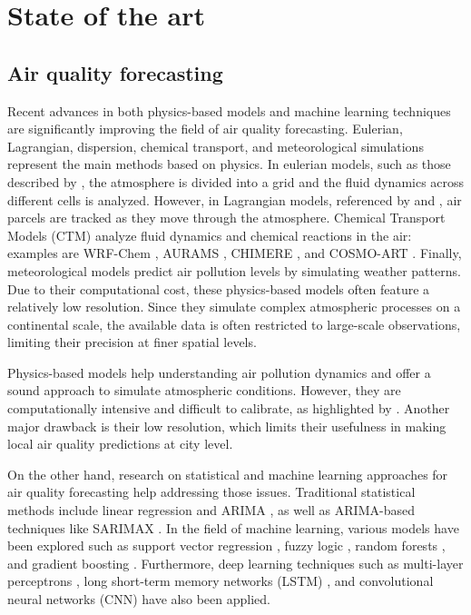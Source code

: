 \documentclass[12pt,a4paper]{book}
\begin{document}
\chapter{State of the art}
\section{Air quality forecasting}
Recent advances in both physics-based models and machine learning techniques are significantly improving the field of air quality forecasting. Eulerian, Lagrangian, dispersion, chemical transport, and meteorological simulations represent the main methods based on physics. In eulerian models, such as those described by \citet{wong_wrf-cmaq_2012}, the atmosphere is divided into a grid and the fluid dynamics across different cells is analyzed. However, in Lagrangian models, referenced by \citet{eliassen_aspects_1984} and \citet{romanov_graz_2020}, air parcels are tracked as they move through the atmosphere. Chemical Transport Models (CTM) analyze fluid dynamics and chemical reactions in the air: examples are WRF-Chem \citep{georgiou_evaluation_2022}, AURAMS \citep{smyth_comparative_2009}, CHIMERE \citep{menut_chimere_2021}, and COSMO-ART \citep{ponomarev_application_2020}. Finally, meteorological models \citep{liu_air_2022} predict air pollution levels by simulating weather patterns. Due to their computational cost, these physics-based models often feature a relatively low resolution. Since they simulate complex atmospheric processes on a continental scale, the available data is often restricted to large-scale observations, limiting their precision at finer spatial levels.

Physics-based models help understanding air pollution dynamics and offer a sound approach to simulate atmospheric conditions. However, they are computationally intensive and difficult to calibrate, as highlighted by \citet{gardner-frolick_selecting_2022}. Another major drawback is their low resolution, which limits their usefulness in making local air quality predictions at city level.

On the other hand, research on statistical and machine learning approaches for air quality forecasting \citep[e.g. ][]{bai_air_2018,masood_review_2021} help addressing those issues. Traditional statistical methods include linear regression and ARIMA \citep{diaz-robles_hybrid_2008}, as well as ARIMA-based techniques like SARIMAX \citep{de_medrano_socaire_2021}. In the field of machine learning, various models have been explored such as support vector regression \citep{garcia_nieto_svm-based_2013,yeganeh_prediction_2012}, fuzzy logic \citep{carbajal-hernandez_assessment_2012}, random forests \citep{thongthammachart_integrated_2021}, and gradient boosting \citep{ma_time_2022}. Furthermore, deep learning techniques such as multi-layer perceptrons \citep{singh_linear_2012}, long short-term memory networks (LSTM) \citep{alhirmizy_multivariate_2019}, and convolutional neural networks (CNN) \citep{soh_adaptive_2018} have also been applied.
\end{document}

